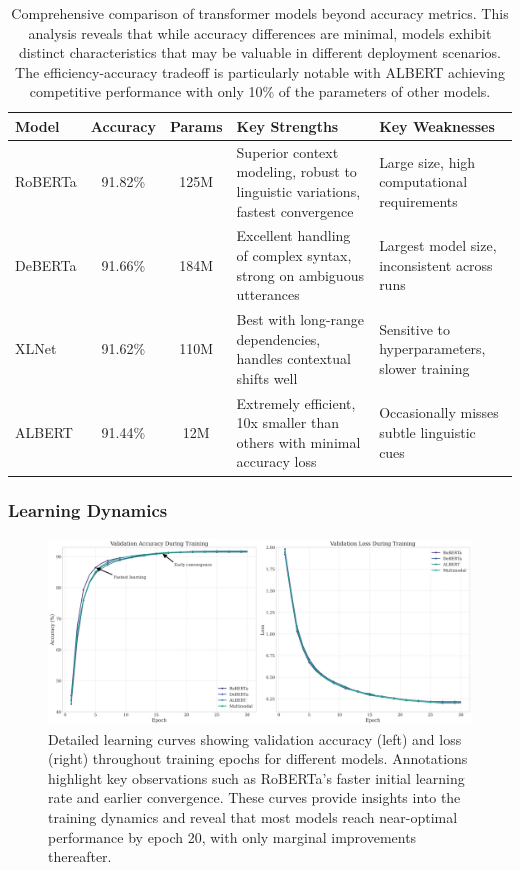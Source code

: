 \documentclass[12pt]{article}
\begin{document}
\begin{table}[h]
\centering
\begin{tabular}{|p{2cm}|c|c|p{4cm}|p{4cm}|}
\hline
\textbf{Model} & \textbf{Accuracy} & \textbf{Params} & \textbf{Key Strengths} & \textbf{Key Weaknesses} \\
\hline
RoBERTa & 91.82\% & 125M & Superior context modeling, robust to linguistic variations, fastest convergence & Large size, high computational requirements \\
\hline
DeBERTa & 91.66\% & 184M & Excellent handling of complex syntax, strong on ambiguous utterances & Largest model size, inconsistent across runs \\
\hline
XLNet & 91.62\% & 110M & Best with long-range dependencies, handles contextual shifts well & Sensitive to hyperparameters, slower training \\
\hline
ALBERT & 91.44\% & 12M & Extremely efficient, 10x smaller than others with minimal accuracy loss & Occasionally misses subtle linguistic cues \\
\hline
\end{tabular}
\caption{Comprehensive comparison of transformer models beyond accuracy metrics. This analysis reveals that while accuracy differences are minimal, models exhibit distinct characteristics that may be valuable in different deployment scenarios. The efficiency-accuracy tradeoff is particularly notable with ALBERT achieving competitive performance with only 10\% of the parameters of other models.}
\label{tab:enhanced_model_comparison}
\end{table}

\subsubsection{Learning Dynamics}
\begin{figure}[h]
    \centering
    \includegraphics[width=0.95\linewidth]{Figures/learning_curves_detailed.png}
    \caption{Detailed learning curves showing validation accuracy (left) and loss (right) throughout training epochs for different models. Annotations highlight key observations such as RoBERTa's faster initial learning rate and earlier convergence. These curves provide insights into the training dynamics and reveal that most models reach near-optimal performance by epoch 20, with only marginal improvements thereafter.}
    \label{fig:learning_curves}
\end{figure}
\end{document}

